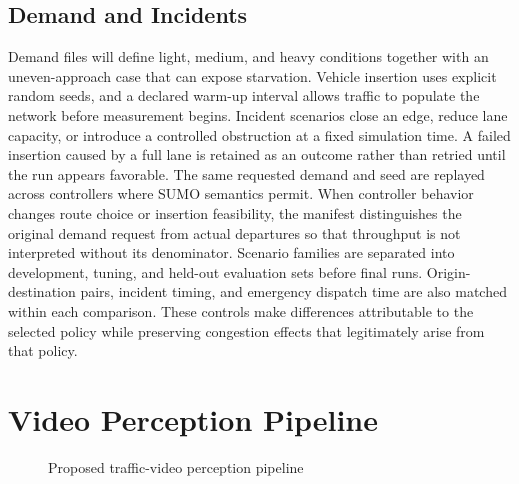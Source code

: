 \subsection{Demand and Incidents}

Demand files will define light, medium, and heavy conditions together with an uneven-approach case that can expose starvation. Vehicle insertion uses explicit random seeds, and a declared warm-up interval allows traffic to populate the network before measurement begins. Incident scenarios close an edge, reduce lane capacity, or introduce a controlled obstruction at a fixed simulation time. A failed insertion caused by a full lane is retained as an outcome rather than retried until the run appears favorable. The same requested demand and seed are replayed across controllers where SUMO semantics permit. When controller behavior changes route choice or insertion feasibility, the manifest distinguishes the original demand request from actual departures so that throughput is not interpreted without its denominator. Scenario families are separated into development, tuning, and held-out evaluation sets before final runs. Origin-destination pairs, incident timing, and emergency dispatch time are also matched within each comparison. These controls make differences attributable to the selected policy while preserving congestion effects that legitimately arise from that policy.

\section{Video Perception Pipeline}

\begin{figure}[htbp]
\centering
{}
\caption{Proposed traffic-video perception pipeline}
\label{fig:perception}
\end{figure}

